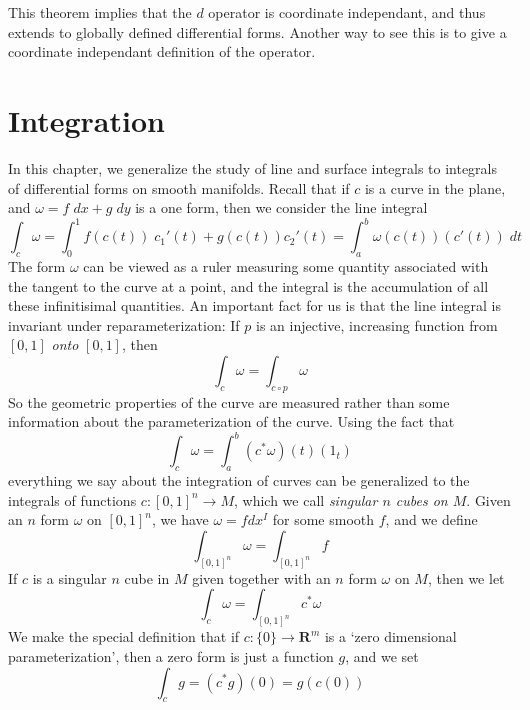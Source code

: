 This theorem implies that the $d$ operator is coordinate independant, and thus extends to globally defined differential forms. Another way to see this is to give a coordinate independant definition of the operator.








\chapter{Integration}

In this chapter, we generalize the study of line and surface integrals to integrals of differential forms on smooth manifolds. Recall that if $c$ is a curve in the plane, and $\omega = f\; dx + g\; dy$ is a one form, then we consider the line integral
%
\[ \int_c \omega = \int_0^1 f(c(t))\; c_1'(t) + g(c(t)) c_2'(t) = \int_a^b \omega(c(t))(c'(t))\; dt \]
%
The form $\omega$ can be viewed as a ruler measuring some quantity associated with the tangent to the curve at a point, and the integral is the accumulation of all these infinitisimal quantities. An important fact for us is that the line integral is invariant under reparameterization: If $p$ is an injective, increasing function from $[0,1]$ {\it onto} $[0,1]$, then
%
\[ \int_c \omega = \int_{c \circ p} \omega \]
%
So the geometric properties of the curve are measured rather than some information about the parameterization of the curve. Using the fact that
%
\[ \int_c \omega = \int_a^b (c^* \omega)(t)(1_t) \]
%
everything we say about the integration of curves can be generalized to the integrals of functions $c: [0,1]^n \to M$, which we call \emph{singular $n$ cubes on $M$}. Given an $n$ form $\omega$ on $[0,1]^n$, we have $\omega = f dx^I$ for some smooth $f$, and we define
%
\[ \int_{[0,1]^n} \omega = \int_{[0,1]^n} f \]
%
If $c$ is a singular $n$ cube in $M$ given together with an $n$ form $\omega$ on $M$, then we let
%
\[ \int_c \omega = \int_{[0,1]^n} c^* \omega \]
%
We make the special definition that if $c: \{ 0 \} \to \mathbf{R}^m$ is a `zero dimensional parameterization', then a zero form is just a function $g$, and we set
%
\[ \int_c g = (c^* g)(0) = g(c(0)) \]
%

